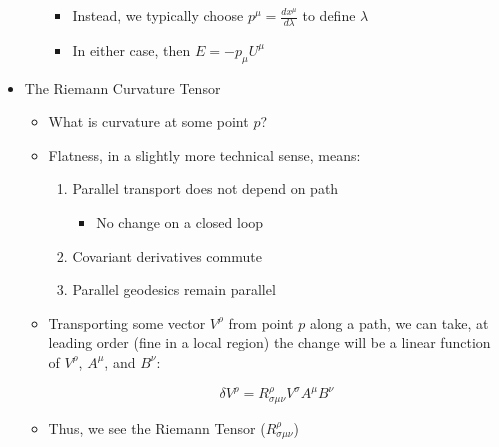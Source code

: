\begin{itemize}
\begin{itemize}
        \begin{itemize}

          \item Instead, we typically choose $p^{\mu}=\frac{dx^{\mu}}{d\lambda}$ to define $\lambda$

          \item In either case, then $E=-p_{\mu}U^{\mu}$

        \end{itemize}

    \end{itemize}

  \item The Riemann Curvature Tensor

    \begin{itemize}

      \item What is curvature at some point $p$?

      \item Flatness, in a slightly more technical sense, means:

        \begin{enumerate}

          \item Parallel transport does not depend on path

            \begin{itemize}

              \item No change on a closed loop

            \end{itemize}

          \item Covariant derivatives commute

          \item Parallel geodesics remain parallel

        \end{enumerate}

      \item Transporting some vector $V^{\rho}$ from point $p$ along a path, we can take, at leading order (fine in a local region) the change will be a linear function of $V^{\rho}$, $A^{\mu}$, and $B^{\nu}$:

        $$\delta V^{\rho}=R^{\rho}_{\sigma\mu\nu}V^{\sigma}A^{\mu}B^{\nu}$$
        
      \item Thus, we see the Riemann Tensor ($R^{\rho}_{\sigma\mu\nu}$)


\end{itemize}
\end{itemize}
